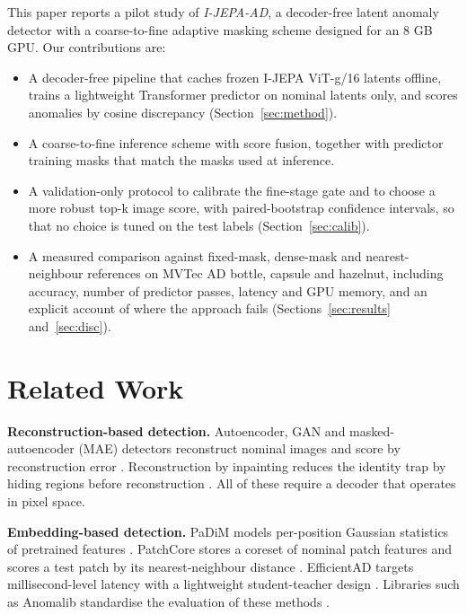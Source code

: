 \documentclass[conference]{IEEEtran}
\begin{document}
This paper reports a pilot study of \emph{I-JEPA-AD}, a decoder-free latent anomaly detector with a coarse-to-fine adaptive masking scheme designed for an 8 GB GPU. Our contributions are:
\begin{itemize}
\item A decoder-free pipeline that caches frozen I-JEPA ViT-g/16 latents offline, trains a lightweight Transformer predictor on nominal latents only, and scores anomalies by cosine discrepancy (Section~\ref{sec:method}).
\item A coarse-to-fine inference scheme with score fusion, together with predictor training masks that match the masks used at inference.
\item A validation-only protocol to calibrate the fine-stage gate and to choose a more robust top-k image score, with paired-bootstrap confidence intervals, so that no choice is tuned on the test labels (Section~\ref{sec:calib}).
\item A measured comparison against fixed-mask, dense-mask and nearest-neighbour references on MVTec AD bottle, capsule and hazelnut, including accuracy, number of predictor passes, latency and GPU memory, and an explicit account of where the approach fails (Sections~\ref{sec:results} and~\ref{sec:disc}).
\end{itemize}

\section{Related Work}
\textbf{Reconstruction-based detection.} Autoencoder, GAN and masked-autoencoder (MAE) detectors reconstruct nominal images and score by reconstruction error \cite{he2022mae,zavrtanik2021draem}. Reconstruction by inpainting reduces the identity trap by hiding regions before reconstruction \cite{zavrtanik2021inpainting}. All of these require a decoder that operates in pixel space.

\textbf{Embedding-based detection.} PaDiM models per-position Gaussian statistics of pretrained features \cite{defard2021padim}. PatchCore stores a coreset of nominal patch features and scores a test patch by its nearest-neighbour distance \cite{roth2022patchcore}. EfficientAD targets millisecond-level latency with a lightweight student-teacher design \cite{batzner2024efficientad}. Libraries such as Anomalib standardise the evaluation of these methods \cite{akcay2022anomalib}.
\end{document}
